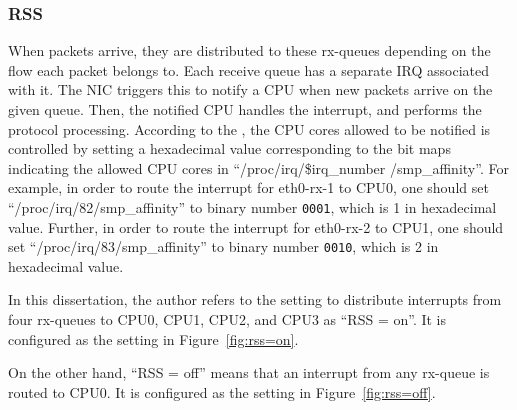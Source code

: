 \subsubsection{RSS}

When packets arrive, they are distributed to these rx-queues depending on the flow each packet belongs to.
Each receive queue has a separate IRQ associated with it. The NIC triggers
this to notify a CPU when new packets arrive on the given queue.
Then, the notified CPU handles the interrupt, and performs the protocol processing. 
According to the \cite{TomHerbert}, the CPU cores allowed to be notified is controlled by setting 
a hexadecimal value corresponding to the bit maps indicating the allowed CPU cores in \enquote{/proc/irq/\$irq\_number /smp\_affinity}.
%
For example, in order to route the interrupt for eth0-rx-1 to CPU0, 
one should set \enquote{/proc/irq/82/smp\_affinity} 
to binary number {\tt 0001}, which is 1 in hexadecimal value.
Further, in order to route the interrupt for eth0-rx-2 to CPU1, one 
should set \enquote{/proc/irq/83/smp\_affinity} 
to binary number {\tt 0010}, which is 2 in hexadecimal value.

In this dissertation, the author refers to the setting to distribute interrupts from four rx-queues to CPU0, CPU1, CPU2, and CPU3 as \enquote{RSS = on}.
It is configured as the setting in Figure~\ref{fig:rss=on}. 

On the other hand, \enquote{RSS = off} means that an interrupt from any rx-queue is routed to CPU0. 
It is configured as the setting in Figure~\ref{fig:rss=off}. 

